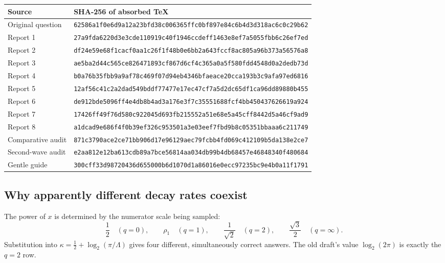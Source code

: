 \documentclass[11pt,oneside]{article}
\numberwithin{equation}{section}
\theoremstyle{definition}
\theoremstyle{remark}
\begin{document}
\begin{longtable}{@{}>{\raggedright\arraybackslash}p{}
 >{\raggedright\arraybackslash\ttfamily\scriptsize}p{}@{}}
\toprule
\normalfont\small Source & \normalfont\small SHA-256 of absorbed TeX\\
\midrule
\endhead
Original question & \nolinkurl{62586a1f0e6d9a12a23bfd38c006365ffc0bf897e84c6b4d3d318ac6c0c29b62}\\
Report 1 & \nolinkurl{27a9fda6220d3e3cde110919c40f1946ccdeff1463e8ef7a5055fbb6c26ef7ed}\\
Report 2 & \nolinkurl{df24e59e68f1cacf0aa1c26f1f48b0e6bb2a643fccf8ac805a96b373a56576a8}\\
Report 3 & \nolinkurl{ae5ba2d44c565ce826471893cf867d6cf4c365a0a5f580fdd4548d0a2dedb73d}\\
Report 4 & \nolinkurl{b0a76b35fbb9a9af78c469f07d94eb4346bfaeace20cca193b3c9afa97ed6816}\\
Report 5 & \nolinkurl{12af56c41c2a2dad549bddf77477e17ec47cf7a5d2dc65df1ca96dd89880b455}\\
Report 6 & \nolinkurl{de912bde5096ff4e4db8b4ad3a176e3f7c35551688fcf4bb450437626619a924}\\
Report 7 & \nolinkurl{17426ff49f76d580c922045d693fb215552a51e68e5a45cff8442d5a46cf9ad9}\\
Report 8 & \nolinkurl{a1dcad9e686f4f0b39ef326c953501a3e03eef7fbd9b8c05351bbaaa6c211749}\\
Comparative audit & \nolinkurl{871c3790ace2ce71bb906d17e96129aec79fcbb4fd069c412109b5da138e2ce7}\\
Second-wave audit & \nolinkurl{e2aa812e12ba613cdb89a7bce56814aa034db99b4db68457e46848340f480684}\\
Gentle guide & \nolinkurl{300cff33d98720436d655000b6d1070d1a86016e0ecc97235bc9e4b0a11f1791}\\
\bottomrule
\end{longtable}

\subsection{Why apparently different decay rates coexist}

The power of $x$ is determined by the numerator scale being sampled:
\[
 \frac12\quad(q=0),\qquad
 \rho_1\quad(q=1),\qquad
 \frac1{\sqrt2}\quad(q=2),\qquad
 \frac{\sqrt3}{2}\quad(q=\infty).
\]
Substitution into
$\kappa=\tfrac12+\log_2(\pi/\Lambda)$ gives four different, simultaneously correct
answers.  The old draft's value $\log_2(2\pi)$ is exactly the $q=2$ row.
\end{document}
